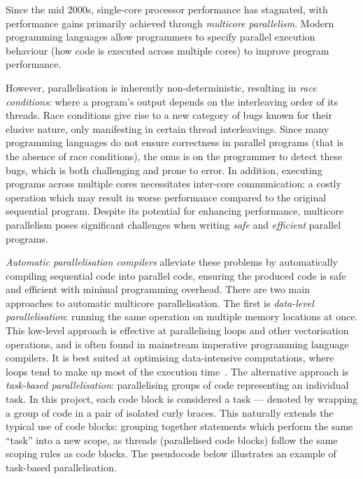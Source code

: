 



\label{sec:1}

Since the mid 2000s, single-core processor performance has stagnated, with performance gains primarily achieved through \textit{multicore parallelism}. Modern programming languages allow programmers to specify parallel execution behaviour (how code is executed across multiple cores) to improve program performance.

However, parallelisation is inherently non-deterministic, resulting in \textit{race conditions}: where a program's output depends on the interleaving order of its threads. Race conditions give rise to a new category of bugs known for their elusive nature, only manifesting in certain thread interleavings. Since many programming languages do not ensure correctness in parallel programs (that is the absence of race conditions), the onus is on the programmer to detect these bugs, which is both challenging and prone to error. In addition, executing programs across multiple cores necessitates inter-core communication: a costly operation which may result in worse performance compared to the original sequential program. Despite its potential for enhancing performance, multicore parallelism poses significant challenges when writing \textit{safe} and \textit{efficient} parallel programs. 

\textit{Automatic parallelisation compilers} alleviate these problems by automatically compiling sequential code into parallel code, ensuring the produced code is safe and efficient with minimal programming overhead. There are two main approaches to automatic multicore parallelisation. The first is \textit{data-level parallelisation}: running the same operation on multiple memory locations at once. This low-level approach is effective at parallelising loops and other vectorisation operations, and is often found in mainstream imperative programming language compilers. It is best suited at optimising data-intensive computations, where loops tend to make up most of the execution time~\cite{doi:10.1080/09720529.2021.1951435}. The alternative approach is \textit{task-based parallelisation}: parallelising groups of code representing an individual task. In this project, each code block is considered a task --- denoted by wrapping a group of code in a pair of isolated curly braces. This naturally extends the typical use of code blocks: grouping together statements which perform the same ``task'' into a new scope, as threads (parallelised code blocks) follow the same scoping rules as code blocks. The pseudocode below illustrates an example of task-based parallelisation.

